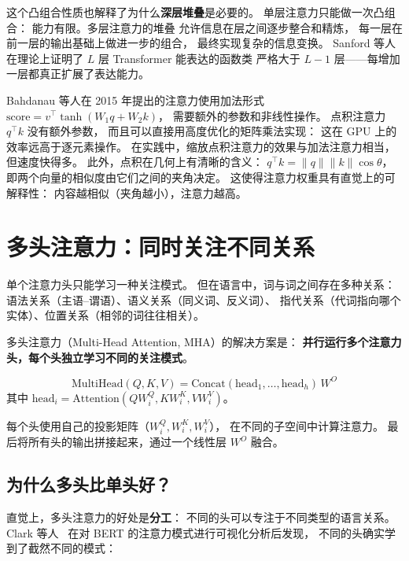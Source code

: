 这个凸组合性质也解释了为什么\textbf{深层堆叠}是必要的。
单层注意力只能做一次凸组合：
能力有限。多层注意力的堆叠
允许信息在层之间逐步整合和精炼，
每一层在前一层的输出基础上做进一步的组合，
最终实现复杂的信息变换。
Sanford 等人~\cite{sanford2023representational}
在理论上证明了 $L$ 层 Transformer 能表达的函数类
严格大于 $L-1$ 层——每增加一层都真正扩展了表达能力。

\begin{whybox}[为什么用点积而不是其他相似度度量？]
Bahdanau 等人在 2015 年提出的注意力使用加法形式
$\mathrm{score} = v^\top \tanh(W_1 q + W_2 k)$，
需要额外的参数和非线性操作。
点积注意力 $q^\top k$ 没有额外参数，
而且可以直接用高度优化的矩阵乘法实现：
这在 GPU 上的效率远高于逐元素操作。
在实践中，缩放点积注意力的效果与加法注意力相当，
但速度快得多。
此外，点积在几何上有清晰的含义：
$q^\top k = \|q\| \|k\| \cos\theta$，
即两个向量的相似度由它们之间的夹角决定。
这使得注意力权重具有直觉上的可解释性：
内容越相似（夹角越小），注意力越高。
\end{whybox}

\section{多头注意力：同时关注不同关系}

单个注意力头只能学习一种关注模式。
但在语言中，词与词之间存在多种关系：
语法关系（主语--谓语）、语义关系（同义词、反义词）、
指代关系（代词指向哪个实体）、位置关系（相邻的词往往相关）。

多头注意力（Multi-Head Attention, MHA）的解决方案是：
\textbf{并行运行多个注意力头，每个头独立学习不同的关注模式}。

\begin{equation}
  \mathrm{MultiHead}(Q, K, V) =
  \mathrm{Concat}(\mathrm{head}_1, \ldots, \mathrm{head}_h) \, W^O
\end{equation}
其中 $\mathrm{head}_i = \mathrm{Attention}(Q W_i^Q, K W_i^K, V W_i^V)$。

每个头使用自己的投影矩阵（$W_i^Q, W_i^K, W_i^V$），
在不同的子空间中计算注意力。
最后将所有头的输出拼接起来，通过一个线性层 $W^O$ 融合。

\subsection{为什么多头比单头好？}

直觉上，多头注意力的好处是\textbf{分工}：
不同的头可以专注于不同类型的语言关系。
Clark 等人~\cite{clark2019bert}
在对 BERT 的注意力模式进行可视化分析后发现，
不同的头确实学到了截然不同的模式：

